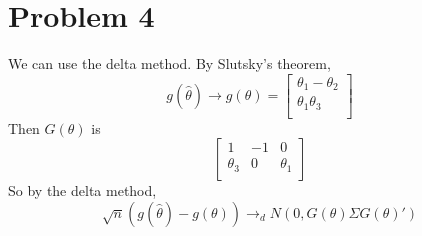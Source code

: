 \documentclass[10pt,letter]{article}
\begin{document}
\section*{Problem 4}
We can use the delta method. By Slutsky's theorem,
\[ g(\hat{\theta}) \to g(\theta) = \begin{bmatrix}
 \theta_1 - \theta_2  \\
 \theta_1\theta_3  \\
\end{bmatrix} \]
Then $G(\theta)$ is
\[ \begin{bmatrix}
 1 & -1 & 0  \\
 \theta_{3} & 0 & \theta_{1} \\
\end{bmatrix} \]
So by the delta method,
\[ \sqrt{n}(g(\hat{\theta}) - g(\theta)) \to_d N(0, G(\theta)\Sigma G(\theta)') \]
\end{document}
